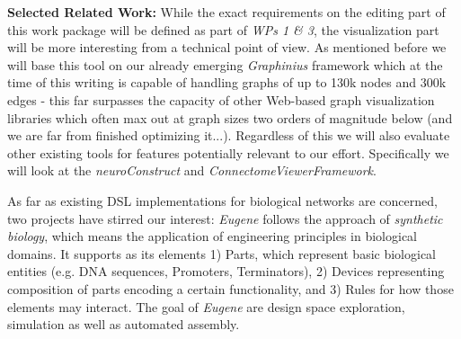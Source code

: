 \documentclass[a4paper,11pt]{article}
\begin{document}
\textbf{Selected Related Work:}
While the exact requirements on the editing part of this work package will be defined as part of \emph{WPs 1 \& 3}, the visualization part will be more interesting from a technical point of view. As mentioned before we will base this tool on our already emerging \emph{Graphinius} framework which at the time of this writing is capable of handling graphs of up to 130k nodes and 300k edges - this far surpasses the capacity of other Web-based graph visualization libraries which often max out at graph sizes two orders of magnitude below (and we are far from finished optimizing it...). Regardless of this we will also evaluate other existing tools for features potentially relevant to our effort. Specifically we will look at the \emph{neuroConstruct} and \emph{ConnectomeViewerFramework}.



As far as existing DSL implementations for biological networks are concerned, two projects have stirred our interest: \emph{Eugene} \citep{Bilitchenko2011Eugene} follows the approach of \textit{synthetic biology}, which means the application of engineering principles in biological domains. It supports as its elements 1) Parts, which represent basic biological entities (e.g. DNA sequences, Promoters, Terminators), 2) Devices representing composition of parts encoding a certain functionality, and 3) Rules for how those elements may interact. The goal of \emph{Eugene} are design space exploration, simulation as well as automated assembly.
\end{document}
